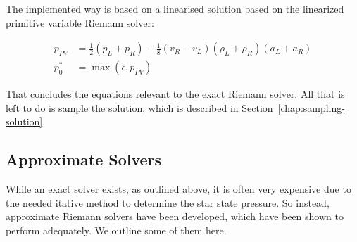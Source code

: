 The implemented way is based on a linearised solution based on the linearized
primitive variable Riemann solver:

\begin{align}
p_{PV} &=
	\frac{1}{2} (p_L + p_R) -
	\frac{1}{8} (v_R - v_L)(\rho_L + \rho_R)(a_L + a_R)\\
	p_0^* &= \max(\epsilon, p_{PV})
\label{eq:pPV}
\end{align}



That concludes the equations relevant to the exact Riemann solver. All that is
left to do is sample the solution, which is described in
Section~\ref{chap:sampling-solution}.






\subsection{Approximate Solvers}\label{chap:riemann-approximate}


While an exact solver exists, as outlined above, it is often very expensive due
to the needed itative method to determine the star state pressure. So instead,
approximate Riemann solvers have been developed, which have been shown to
perform adequately. We outline some of them here.





